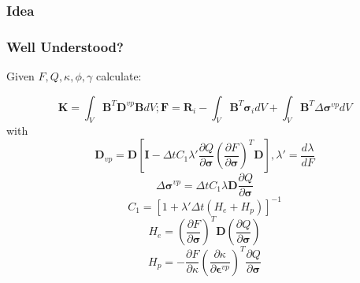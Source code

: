 \documentclass[usenames,dvipsnames]{beamer}
\begin{document}
\begin{frame}
  
  \frametitle{Idea}

\end{frame}
  
  
\begin{frame}
  
  \frametitle{Well Understood?}
  
  Given $F, Q, \kappa, \phi, \gamma$ calculate:

  \begin{equation} \label{EqImplicitFEM}
    \mathbf{K} = \int_V \mathbf{B}^T \mathbf{D}^{vp} \mathbf{B} dV; \mathbf{F} = \mathbf{R}_i - \int_V \mathbf{B}^T \bm{\sigma}_i dV + \int_V \mathbf{B}^T
    \Delta
    \bm{\sigma}^{vp} dV
    \end{equation}
    with
    \begin{equation}
    \mathbf{D}_{vp} =
    \mathbf{D} \left [
    \mathbf{I} - {\Delta t} C_1 \lambda' \frac{\partial Q}{\partial \bm{\sigma}} \left ( \frac{\partial F}{\partial
    \bm{\sigma}} \right )^{T} \mathbf{D}
    \right ], \lambda' = \frac{d \lambda}{d F}
    \end{equation}
    \begin{equation}
    \Delta \bm{\sigma}^{vp} = \Delta t C_1 \lambda \mathbf{D} \frac{\partial Q}{\partial \bm{\sigma}}
    \end{equation}
    \begin{equation}
    C_1 = [1 + \lambda' {\Delta t} (H_e + H_p)]^{-1}
    \end{equation}
    \begin{equation}
    \label{HEE}
    H_e = \left ( \frac{\partial F}{\partial \bm{\sigma}} \right )^T \mathbf{D} (\frac{\partial Q}{\partial \bm{\sigma}})
    \end{equation}
    \begin{equation}
    H_p = -\frac{\partial F}{\partial \kappa} \left ( \frac{\partial \kappa}{\partial \bm{\epsilon}^{vp}}
    \right )^T \frac{\partial Q}{\partial \bm{\sigma}}
    \end{equation}
  
\end{frame}
  
\end{document}
